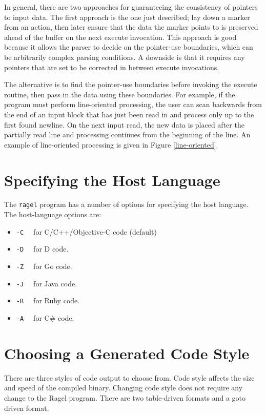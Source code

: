 \documentclass[letterpaper,11pt,oneside]{book}
\begin{document}
In general, there are two approaches for guaranteeing the consistency of
pointers to input data. The first approach is the one just described;
lay down a marker from an action,
then later ensure that the data the marker points to is preserved ahead of
the buffer on the next execute invocation. This approach is good because it
allows the parser to decide on the pointer-use boundaries, which can be
arbitrarily complex parsing conditions. A downside is that it requires any
pointers that are set to be corrected in between execute invocations.

The alternative is to find the pointer-use boundaries before invoking the execute
routine, then pass in the data using these boundaries. For example, if the
program must perform line-oriented processing, the user can scan backwards from
the end of an input block that has just been read in and process only up to the
first found newline. On the next input read, the new data is placed after the
partially read line and processing continues from the beginning of the line.
An example of line-oriented processing is given in Figure \ref{line-oriented}.

\section{Specifying the Host Language}

The \verb|ragel| program has a number of options for specifying the host
language. The host-language options are:

\begin{itemize}
\item \verb|-C  | for C/C++/Objective-C code (default)
\item \verb|-D  | for D code.
\item \verb|-Z  | for Go code.
\item \verb|-J  | for Java code.
\item \verb|-R  | for Ruby code.
\item \verb|-A  | for C\# code.
\end{itemize}

\section{Choosing a Generated Code Style}
\label{genout}

There are three styles of code output to choose from. Code style affects the
size and speed of the compiled binary. Changing code style does not require any
change to the Ragel program. There are two table-driven formats and a goto
driven format.
\end{document}
